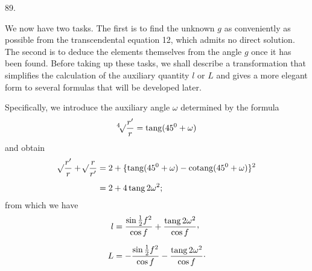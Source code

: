 \par{}\medskip
\hypertarget{native-120-article089}{}
\begin{center}89.\end{center}
We now have two tasks. The first is to find the unknown $g$ as conveniently as possible from the transcendental equation 12, which admits no direct solution. The second is to deduce the elements themselves from the angle $g$ once it has been found. Before taking up these tasks, we shall describe a transformation that simplifies the calculation of the auxiliary quantity $l$ or $L$ and gives a more elegant form to several formulas that will be developed later.

Specifically, we introduce the auxiliary angle $\omega$ determined by the formula
\[
\BareRoot[4]{\dfrac{r'}{r}}=\operatorname{tang}(45^0+\omega)
\]
and obtain
\[
\begin{aligned}
\BareRoot{\dfrac{r'}{r}}+\BareRoot{\dfrac{r}{r'}}
&=2+\{\operatorname{tang}(45^0+\omega)-\operatorname{cotang}(45^0+\omega)\}^2\\[4pt]
&=2+4\operatorname{tang}2\omega^2;
\end{aligned}
\]
from which we have
\[
\begin{aligned}
l&=\frac{\sin\tfrac12f^2}{\cos f}+\frac{\operatorname{tang}2\omega^2}{\cos f}\mathpunct{\raisebox{.45ex}{,}}\\[6pt]
L&=-\frac{\sin\tfrac12f^2}{\cos f}-\frac{\operatorname{tang}2\omega^2}{\cos f}\mathpunct{\cdot}
\end{aligned}
\]
